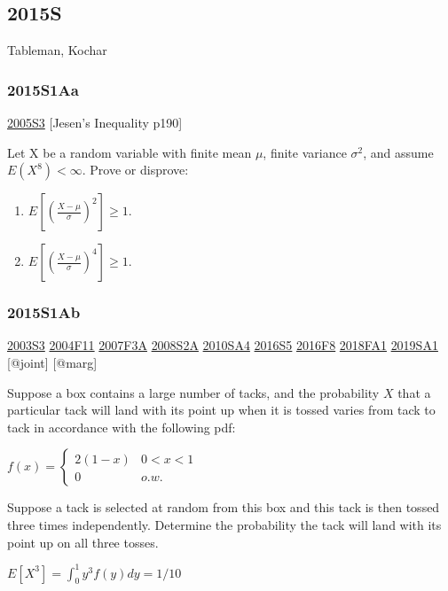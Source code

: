 \documentclass[6pt,twocolumn,Portrait]{article}
\begin{document}
\hypertarget{s-8}{%
\subsection{2015S}\label{s-8}}

Tableman, Kochar

\hypertarget{s1aa}{%
\subsubsection{2015S1Aa}\label{s1aa}}

\protect\hyperlink{s3-1}{2005S3} {[}Jesen's Inequality p190{]}

Let X be a random variable with finite mean \(\mu\), finite variance
\(\sigma^2\), and assume \(E(X^8)<\infty\). Prove or disprove:

\begin{enumerate}
\def\labelenumi{\roman{enumi}.}
\item
  \(E[(\frac{X-\mu}{\sigma})^2]\ge1\).
\item
  \(E[(\frac{X-\mu}{\sigma})^4]\ge1\).
\end{enumerate}

\hypertarget{s1ab}{%
\subsubsection{2015S1Ab}\label{s1ab}}

\protect\hyperlink{s3}{2003S3} \protect\hyperlink{f11}{2004F11}
\protect\hyperlink{f3a}{2007F3A} \protect\hyperlink{s2a}{2008S2A}
\protect\hyperlink{sa4-1}{2010SA4} \protect\hyperlink{s5-4}{2016S5}
\protect\hyperlink{f8-4}{2016F8} \protect\hyperlink{fa1-4}{2018FA1}
\protect\hyperlink{sa1-3}{2019SA1} {[}@joint{]} {[}@marg{]}

Suppose a box contains a large number of tacks, and the probability
\(X\) that a particular tack will land with its point up when it is
tossed varies from tack to tack in accordance with the following pdf:

\(f(x)=\begin{cases}2(1-x)&0<x<1\\0& o.w.\end{cases}\)

Suppose a tack is selected at random from this box and this tack is then
tossed three times independently. Determine the probability the tack
will land with its point up on all three tosses.

 \(E[X^3]=\int_0^1y^3f(y)dy=1/10\)
\end{document}
